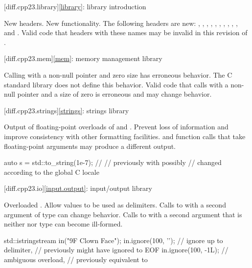 [diff.cpp23.library]{\ref*{library}: library introduction}

\change
New headers.
\rationale
New functionality.
\effect
The following \Cpp{} headers are new:
,
,
,
,
,
,
,
,
,
, and
.
Valid \CppXXIII{} code that  headers with these names may be
invalid in this revision of \Cpp{}.

[diff.cpp23.mem]{\ref*{mem}: memory management library}

\change
Calling  with a non-null pointer and zero size
has erroneous behavior.
\rationale
The C standard library does not define this behavior.
\effect
Valid \CppXXIII{} code that calls 
with a non-null pointer and a size of zero is erroneous and may change behavior.

[diff.cpp23.strings]{\ref*{strings}: strings library}

\change
Output of floating-point overloads of  and .
\rationale
Prevent loss of information and improve consistency with other formatting
facilities.
\effect
{} and  function calls that take
floating-point arguments may produce a different output.
\begin{example}
\begin{codeblock}
auto s = std::to_string(1e-7);  // 
                                // previously  with  possibly
                                // changed according to the global C locale
\end{codeblock}
\end{example}

[diff.cpp23.io]{\ref*{input.output}: input/output library}

\change
Overloaded .
\rationale
Allow  values to be used as delimiters.
\effect
Calls to  with a second argument of  type
can change behavior.
Calls to  with a second argument that is neither
 nor  type can become ill-formed.
\begin{example}
\begin{codeblock}
std::istringstream in("\x9F Clown Face");
in.ignore(100, '');     // ignore up to  delimiter,
                            // previously might have ignored to EOF
in.ignore(100, -1L);        // ambiguous overload,
                            // previously equivalent to 
\end{codeblock}
\end{example}

